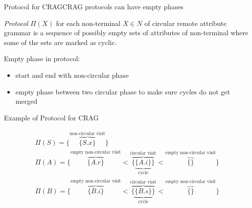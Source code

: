 \begin{frame}{Protocol for CRAG}{CRAG protocols can have empty phases}

\begin{definition}
\emph{Protocol} $\Pi(X)$ for each non-terminal $X \in N$ of circular remote attribute grammar is a \alert{sequence of possibly empty sets} of attributes of non-terminal where some of the sets are marked as cyclic.
\end{definition}

Empty phase in protocol:
\begin{itemize}
    \item start and end with non-circular phase
    \item empty phase between two circular phase to make sure cycles do not get merged
\end{itemize}

\end{frame}





\begin{frame}{Example of Protocol for CRAG}

\begin{equation}\label{eq:protocol-for-crag-example}
\begin{gathered}
\Pi(S) =  \Big \{   \overbrace{\{ S.x \} }^{\text{non-circular visit}}     \Big \} \\
\Pi(A) =  \Big \{  
\overbrace{\big \{  A.r  \big \}}^{\text{empty non-circular visit}} <
\overbrace{\big \{  \underbrace{  \{  A.i  \}}_{\text{cycle}}  \big \}}^{\text{circular visit}} <
\overbrace{\big \{    \big \}}^{\text{empty non-circular visit}}
\Big \} \\
\Pi(B) =  \Big \{
\overbrace{\big \{   B.i  \big \}}^{\text{empty non-circular visit}} <
\overbrace{\big \{  \underbrace{  \{  B.s \}}_{\text{cycle}}  \big \}}^{\text{circular visit}} <
\overbrace{\big \{    \big \}}^{\text{empty non-circular visit}}
\Big \} \\
\end{gathered}
\end{equation}
    
\end{frame}


